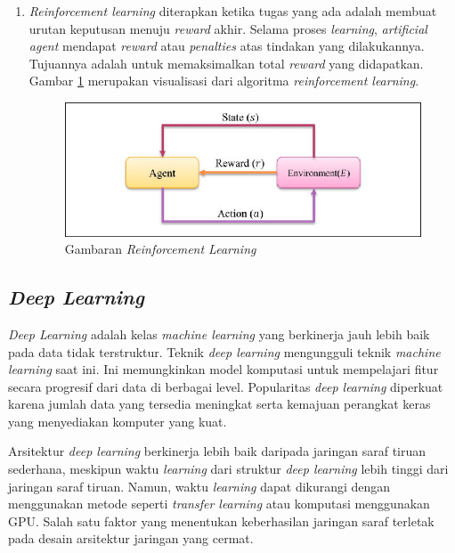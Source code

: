 \begin{enumerate}
	
	\item \textit{Reinforcement learning} diterapkan ketika tugas yang ada
	adalah membuat urutan keputusan menuju \textit{reward} akhir. Selama proses \textit{learning}, \textit{artificial agent} mendapat \textit{reward} atau \textit{penalties} atas tindakan yang dilakukannya. Tujuannya adalah untuk memaksimalkan total \textit{reward} yang didapatkan. Gambar \ref{fig:reinforcement} merupakan visualisasi dari algoritma \textit{reinforcement learning}.
	
	\begin{figure}[ht]
		\centering
		\includegraphics[scale=0.3]{gambar/reinforcement.png}
		\caption{Gambaran \textit{Reinforcement Learning}\citep{reinforcement}}
		\label{fig:reinforcement}
	\end{figure}
\end{enumerate}

\subsection{\textit{Deep Learning}}
\label{subsec:deeplearning}

\textit{Deep Learning} adalah kelas \textit{machine learning} yang berkinerja jauh lebih baik pada data tidak terstruktur\citep{dl}. Teknik \textit{deep learning} mengungguli teknik \textit{machine learning} saat ini. Ini memungkinkan model komputasi untuk mempelajari fitur secara progresif dari data di berbagai level. Popularitas \textit{deep learning} diperkuat karena jumlah data yang tersedia meningkat serta kemajuan perangkat keras yang menyediakan komputer yang kuat.

Arsitektur \textit{deep learning} berkinerja lebih baik daripada jaringan saraf tiruan  sederhana, meskipun waktu \textit{learning} dari struktur \textit{deep learning} lebih tinggi dari jaringan saraf tiruan. Namun, waktu \textit{learning} dapat dikurangi dengan menggunakan metode seperti \textit{transfer learning} atau komputasi menggunakan GPU. Salah satu faktor yang menentukan keberhasilan jaringan saraf terletak pada desain arsitektur jaringan yang cermat.

